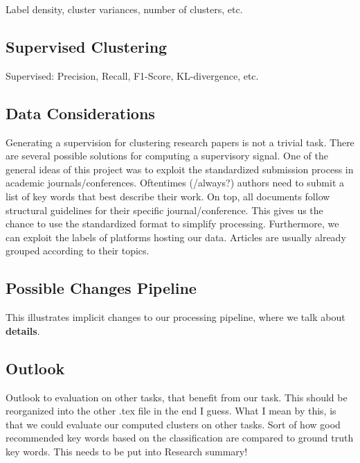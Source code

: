 Label density, cluster variances, number of clusters, etc.


\subsection{Supervised Clustering}
Supervised: Precision, Recall, F1-Score, KL-divergence, etc.


\subsection{Data Considerations}
Generating a supervision for clustering research papers is not a trivial task. There are several possible solutions for computing a supervisory signal. One of the general ideas of this project was to exploit the standardized submission process in academic journals/conferences. Oftentimes (/always?) authors need to submit a list of key words that best describe their work. On top, all documents follow structural guidelines for their specific journal/conference. This gives us the chance to use the standardized format to simplify processing. Furthermore, we can exploit the labels of platforms hosting our data. Articles are usually already grouped according to their topics. 


\subsection{Possible Changes Pipeline}
This illustrates implicit changes to our processing pipeline, where we talk about \textbf{details}.


\subsection{Outlook}
Outlook to evaluation on other tasks, that benefit from our task. This should be reorganized into the other .tex file in the end I guess. What I mean by this, is that we could evaluate our computed clusters on other tasks. Sort of how good recommended key words based on the classification are compared to ground truth key words. This needs to be put into Research summary! 


\newpage %